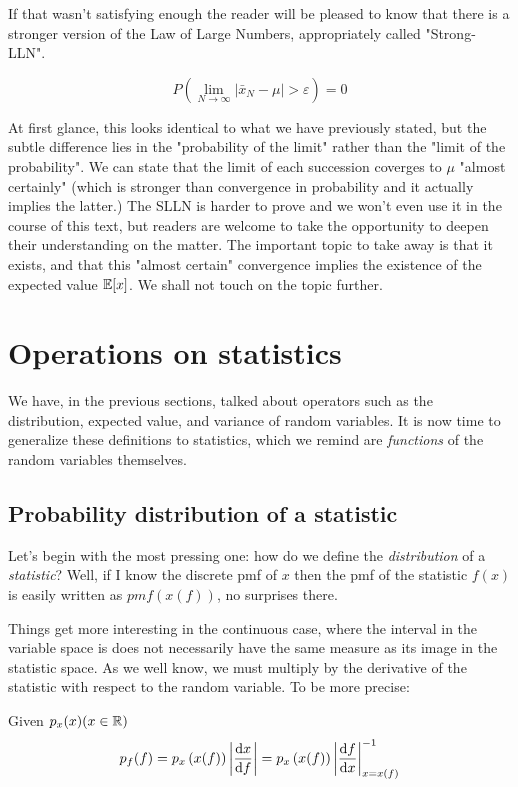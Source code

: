 If that wasn't satisfying enough the reader will be pleased to know that there is a stronger version of the Law of Large Numbers, appropriately called "Strong-LLN". 

\begin{theorem}
	\[
	P\left( \lim_{N\to\infty} \left| \bar{x}_N - \mu \right| > \varepsilon \right) = 0
	\]
\end{theorem}

At first glance, this looks identical to what we have previously stated, but the subtle difference lies in the "probability of the limit" rather than the "limit of the probability". We can state that the limit of each succession coverges to $\mu$ "almost certainly" (which is stronger than convergence in probability and it actually implies the latter.) The SLLN is harder to prove and we won't even use it in the course of this text, but readers are welcome to take the opportunity to deepen their understanding on the matter. The important topic to take away is that it exists, and that this "almost certain" convergence implies the existence of the expected value $\mathbb{E}[x]$. We shall not touch on the topic further.

\section{Operations on statistics}
\label{sec:stat-operations}

We have, in the previous sections, talked about operators such as the distribution, expected value, and variance of random variables. It is now time to generalize these definitions to statistics, which we remind are \emph{functions} of the random variables themselves. 

\subsection{Probability distribution of a statistic}
Let's begin with the most pressing one: how do we define the \emph{distribution} of a \emph{statistic}? Well, if I know the discrete pmf of $x$ then the pmf of the statistic $f(x)$ is easily written as $pmf\left(x(f)\right)$, no surprises there. 

Things get more interesting in the continuous case, where the interval in the variable space is does not necessarily have the same measure as its image in the statistic space. As we well know, we must multiply by the derivative of the statistic with respect to the random variable. To be more precise:
\begin{definition}
	Given $p_x(x) (x\in\mathbb{R})$
	\[
	p_f(f) = p_x\left(x(f)\right)\left|\frac{\mathrm{d} x}{\mathrm{d} f}\right| = p_x\left(x(f)\right)\left|\frac{\mathrm{d} f}{\mathrm{d} x}\right|^{-1}_{x=x(f)} 
	\]
\label{def:pdf_var_change}
\end{definition}

